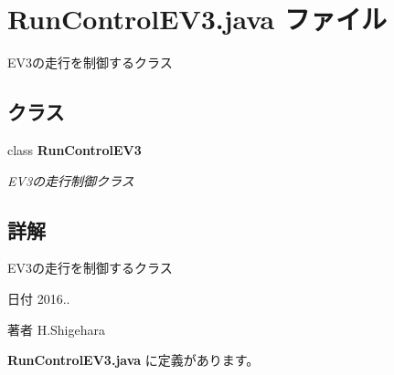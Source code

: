 \section{Run\-Control\-E\-V3.\-java ファイル}
\label{_run_control_e_v3_8java}


E\-V3の走行を制御するクラス  


\subsection*{クラス}
\begin{DoxyCompactItemize}
\item 
class {\bf Run\-Control\-E\-V3}
\begin{DoxyCompactList}\small\item\em E\-V3の走行制御クラス \end{DoxyCompactList}\end{DoxyCompactItemize}


\subsection{詳解}
E\-V3の走行を制御するクラス \begin{DoxyDate}{日付}
2016.. 
\end{DoxyDate}
\begin{DoxyAuthor}{著者}
H.\-Shigehara 
\end{DoxyAuthor}


 {\bf Run\-Control\-E\-V3.\-java} に定義があります。

